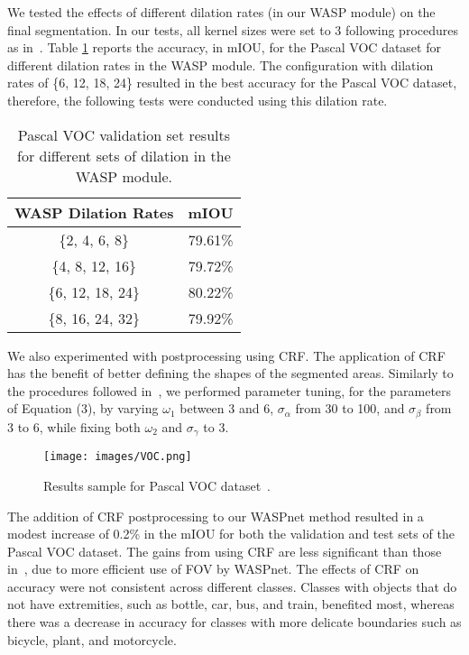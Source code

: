 \documentclass[sensors,article,accept,moreauthors,pdftex]{Definitions/mdpi}
\begin{document}
We tested the effects of different dilation rates (in our WASP module) on the final segmentation. In our tests, all kernel sizes were set to 3 following procedures as in~\cite{DeepLab}. Table \ref{tab:DilationRates} reports the accuracy, in mIOU, for the Pascal VOC dataset for different dilation rates in the WASP module.
The configuration with dilation rates of \{6, 12, 18, 24\} resulted in the best accuracy for the Pascal VOC dataset, therefore, the following tests were conducted using this dilation rate.

\begin{table}[H]
\caption{Pascal VOC validation set results for different sets of dilation in the WASP module.}
\centering
\begin{tabular}{cc}
\toprule
\textbf{WASP Dilation Rates} & \textbf{mIOU}\\
\midrule
\{2, 4, 6, 8\}&79.61\%\\
\{4, 8, 12, 16\}&79.72\%\\
\{6, 12, 18, 24\}&80.22\%\\
\{8, 16, 24, 32\}&79.92\%\\
\bottomrule
\end{tabular}
\label{tab:DilationRates}
\end{table}




We also experimented with postprocessing using CRF. The application of CRF has the benefit of better defining the shapes of the segmented areas.
Similarly to the procedures followed in~\cite{DeepLab}, we performed parameter tuning, for the parameters of Equation (3), by varying $\omega_{1}$ between 3 and 6, $\sigma_{\alpha}$ from 30 to 100, and $\sigma_{\beta}$ from 3 to 6, while fixing both $\omega_{2}$ and $\sigma_{\gamma}$ to 3.

\begin{figure}[H]
\centering
\texttt{[image: images/VOC.png]}
\caption{Results sample for Pascal VOC dataset~\cite{Pascal}.}
\label{fig:ImagesVOC}
\end{figure}

The addition of CRF postprocessing to our WASPnet method resulted in a modest increase of 0.2\% in the mIOU for both the validation and test sets of the Pascal VOC dataset. The gains from using CRF are less significant than those in~\cite{DeepLab}, due to more efficient use of FOV by WASPnet.
The effects of CRF on accuracy were not consistent across different classes.
Classes with objects that do not have extremities, such as bottle, car, bus, and train, benefited most, whereas there was a decrease in accuracy for classes with more delicate boundaries such as bicycle, plant, and motorcycle.
\end{document}
